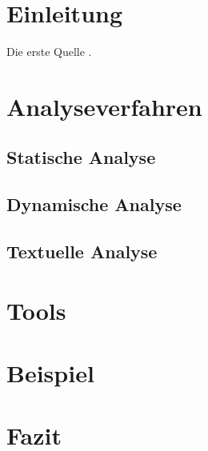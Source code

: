 \chapter{Einleitung}

Die erste Quelle \cite{survey}.

\chapter{Analyseverfahren}
\section{Statische Analyse}
\section{Dynamische Analyse}
\section{Textuelle Analyse}

\chapter{Tools}
\chapter{Beispiel}
\chapter{Fazit}